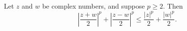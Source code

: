 Let $z$ and $w$ be complex numbers, and suppose $p \geq 2$. Then
$$\left| \frac{z+w}{2} \right|^p + \left| \frac{z-w}{2} \right|^p \leq \frac{|z|^p}{2} + \frac{|w|^p}{2}.$$
